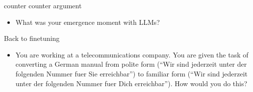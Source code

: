 

\begin{vbframe}{counter counter argument}

\vfill

%
\begin{itemize}
\item \ques What was your emergence moment with LLMs?

%
\end{itemize}


\vfill

\end{vbframe}

\begin{vbframe}{Back to finetuning}

\vfill

%
\begin{itemize}
\item \ques You are working at a telecommunications
company. You are given the task of converting a German manual from
polite form (``Wir sind jederzeit unter der folgenden
Nummer fuer Sie erreichbar'') to familiar form
(``Wir sind jederzeit unter der folgenden
Nummer fuer Dich erreichbar''). How would you do this?

\end{itemize}


\vfill

\end{vbframe}









\endlecture

